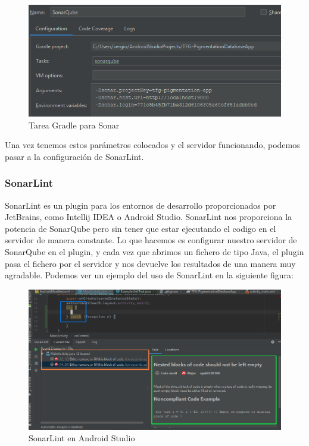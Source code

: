 \begin{figure}[H]
    \centering
    \includegraphics[scale=1]{imagenes/introduccion/sonarGradleTask.png}
    \caption{Tarea Gradle para Sonar}
    \label{fig:sonarGradleTask}
\end{figure}

Una vez tenemos estos parámetros colocados y el servidor funcionando, podemos pasar a la configuración de SonarLint.

\subsubsection{SonarLint}
SonarLint \cite{sonarlint} es un plugin para los entornos de desarrollo proporcionados por JetBrains, como Intellij IDEA o Android Studio. SonarLint nos proporciona la potencia de SonarQube pero sin tener que estar ejecutando el codigo en el servidor de manera constante. Lo que hacemos es configurar nuestro servidor de SonarQube en el plugin, y cada vez que abrimos un fichero de tipo Java, el plugin pasa el fichero por el servidor y nos devuelve los resultados de una manera muy agradable. Podemos ver un ejemplo del uso de SonarLint en la siguiente figura:

\begin{figure}[H]
    \centering
    \includegraphics[scale=0.5]{imagenes/introduccion/sonarLint.png}
    \caption{SonarLint en Android Studio}
    \label{fig:sonarLinr}
\end{figure}

